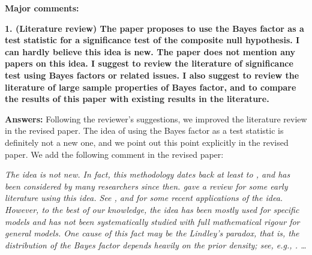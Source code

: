 \documentclass[11pt]{article}
\theoremstyle{plain}
\theoremstyle{definition}
\theoremstyle{remark}
\begin{document}
\textbf{Major comments:}

\textbf{1.
    (Literature review) The paper proposes to use the Bayes factor as a test statistic for a significance test of the composite null hypothesis. I can hardly believe this idea is new. The paper does not mention any papers on this idea. I suggest to review the literature of significance test using Bayes factors or related issues. I also suggest to review the literature of large sample properties of Bayes factor, and to compare the results of this paper with existing results in the literature.
}

\textbf{Answers:}
Following the reviewer's suggestions, we improved the literature review in the revised paper.
The idea of using the Bayes factor as a test statistic is definitely not a new one, and we point out this point explicitly in the revised paper.
We add the following comment in the revised paper:
\begin{adjustwidth}{1.5em}{1.5em}
    \emph{
The idea is not new.                                                                                      
In fact, this methodology dates back at least to \cite{Good1967}, and has been considered by many
researchers since then.
\cite{Good1992} gave a review for some early literature using this idea.                                  
See \cite{Aerts2004}, \cite{zhou2018On} and \cite{Wang2020} for some recent applications of the idea. 
However, to the best of our knowledge, the idea has been mostly used for specific models and has not been 
systematically studied with full mathematical rigour for general models.                                  
One cause of this fact may be the Lindley's paradox, that is, the distribution of the Bayes factor        
depends heavily on the prior density; see, e.g., \cite{Shafer1982}. \ldots
}
\end{adjustwidth}
\end{document}
